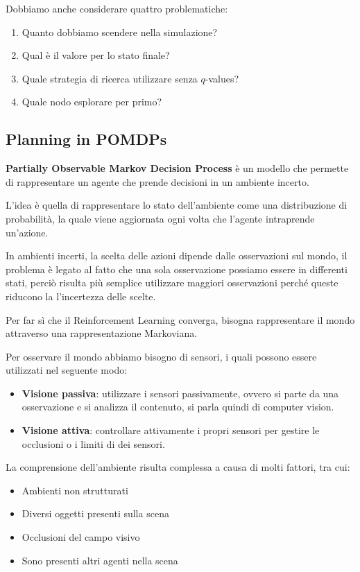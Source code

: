 Dobbiamo anche considerare quattro problematiche:
\begin{enumerate}
    \item Quanto dobbiamo scendere nella simulazione?
    \item Qual è il valore per lo stato finale?
    \item Quale strategia di ricerca utilizzare senza $q$-values?
    \item Quale nodo esplorare per primo?
\end{enumerate}
\subsection{Planning in POMDPs}
\textbf{Partially Observable Markov Decision Process} è un modello che permette di
rappresentare un agente che prende decisioni in un ambiente incerto.

L'idea è quella di rappresentare lo stato dell'ambiente come una distribuzione di
probabilità, la quale viene aggiornata ogni volta che l'agente intraprende un'azione.

In ambienti incerti, la scelta delle azioni dipende dalle osservazioni sul mondo,
il problema è legato al fatto che una sola osservazione possiamo essere in
differenti stati, perciò risulta più semplice utilizzare maggiori osservazioni
perché queste riducono la l'incertezza delle scelte.

Per far sì che il Reinforcement Learning converga, bisogna rappresentare il mondo
attraverso una rappresentazione Markoviana.

Per osservare il mondo abbiamo bisogno di sensori, i quali possono essere
utilizzati nel seguente modo:
\begin{itemize}
    \item \textbf{Visione passiva}: utilizzare i sensori passivamente, ovvero si
          parte da una osservazione e si analizza il contenuto, si parla quindi 
          di computer vision.
    \item \textbf{Visione attiva}: controllare attivamente i propri sensori per
          gestire le occlusioni o i limiti di dei sensori.
\end{itemize}

La comprensione dell'ambiente risulta complessa a causa di molti fattori, tra 
cui:
\begin{itemize}
    \item Ambienti non strutturati
    \item Diversi oggetti presenti sulla scena
    \item Occlusioni del campo visivo
    \item Sono presenti altri agenti nella scena
\end{itemize}


